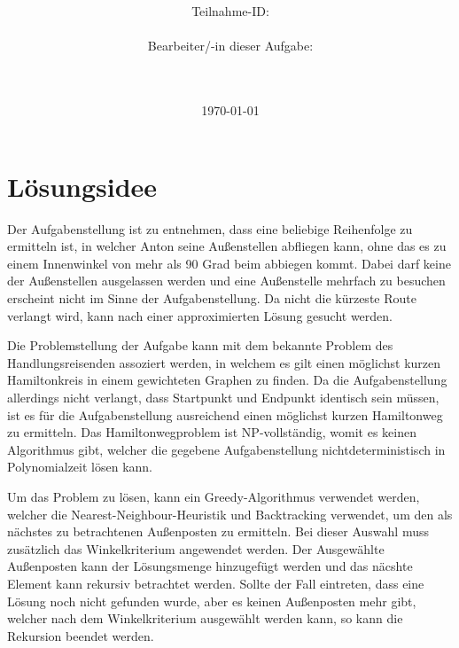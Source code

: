 \documentclass[a4paper,10pt,ngerman]{scrartcl}
\title{\textbf{\Huge\Aufgabe}}
\author{\LARGE Teilnahme-ID: \LARGE \TeilnahmeId \\\\
\LARGE Bearbeiter/-in dieser Aufgabe: \\
\LARGE \Name\\\\}
\date{\LARGE\today}
\begin{document}
    \maketitle
    \tableofcontents
    \vspace{0.5cm}
    \newpage


    \section{Lösungsidee}\label{sec:losungsidee}

    Der Aufgabenstellung ist zu entnehmen, dass eine beliebige Reihenfolge zu ermitteln ist,
    in welcher Anton seine Außenstellen abfliegen kann,
    ohne das es zu einem Innenwinkel von mehr als 90 Grad beim abbiegen kommt.
    Dabei darf keine der Außenstellen ausgelassen werden
    und eine Außenstelle mehrfach zu besuchen erscheint nicht im Sinne der Aufgabenstellung.
    Da nicht die kürzeste Route verlangt wird, kann nach einer approximierten Lösung gesucht werden.

    Die Problemstellung der Aufgabe kann mit dem bekannte Problem des Handlungsreisenden assoziert werden,
    in welchem es gilt einen möglichst kurzen Hamiltonkreis in einem gewichteten Graphen zu finden.
    Da die Aufgabenstellung allerdings nicht verlangt, dass Startpunkt und Endpunkt identisch sein müssen,
    ist es für die Aufgabenstellung ausreichend einen möglichst kurzen Hamiltonweg zu ermitteln.
    Das Hamiltonwegproblem ist NP-vollständig, womit es keinen Algorithmus gibt,
    welcher die gegebene Aufgabenstellung nichtdeterministisch in Polynomialzeit lösen kann.

    Um das Problem zu lösen, kann ein Greedy-Algorithmus verwendet werden,
    welcher die Nearest-Neighbour-Heuristik und Backtracking verwendet,
    um den als nächstes zu betrachtenen Außenposten zu ermitteln.
    Bei dieser Auswahl muss zusätzlich das Winkelkriterium angewendet werden.
    Der Ausgewählte Außenposten kann der Lösungsmenge hinzugefügt werden
    und das näcshte Element kann rekursiv betrachtet werden.
    Sollte der Fall eintreten, dass eine Lösung noch nicht gefunden wurde, aber es keinen Außenposten mehr gibt,
    welcher nach dem Winkelkriterium ausgewählt werden kann, so kann die Rekursion beendet werden.
\end{document}
